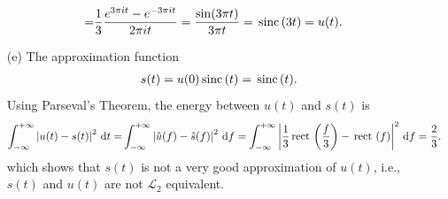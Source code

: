 \documentclass{assignment}
\begin{document}
\begin{sol}
\begin{itemize}
\begin{align}
            \notag=&\frac{1}{3}\frac{e^{3\pi it}-e^{-3\pi it}}{2\pi it}=\frac{\sin(3\pi t)}{3\pi t}=\,\text{sinc}\,(3t)=u(t).
        \end{align}
        \item[(e)] The approximation function
        \begin{align}
            s(t)=u(0)\,\text{sinc}\,(t)=\,\text{sinc}\,(t).
        \end{align}
        Using Parseval's Theorem, the energy between $u(t)$ and $s(t)$ is
        \begin{align}
            \notag\int_{-\infty}^{+\infty}\left\lvert u(t)-s(t)\right\rvert^2\,\mathrm{d}t=&\int_{-\infty}^{+\infty}\left\lvert\hat{u}(f)-\hat{s}(f)\right\rvert^2\,\mathrm{d}f=\int_{-\infty}^{+\infty}\left\lvert\frac{1}{3}\,\text{rect}\,\left(\frac{f}{3}\right)-\,\text{rect}\,\left(f\right)\right\rvert^2\,\mathrm{d}f=\frac{2}{3}.
        \end{align}
        which shows that $s(t)$ is not a very good approximation of $u(t)$, i.e., $s(t)$ and $u(t)$ are not $\mathcal{L}_2$ equivalent.
    \end{itemize}
\end{sol}
\end{document}

